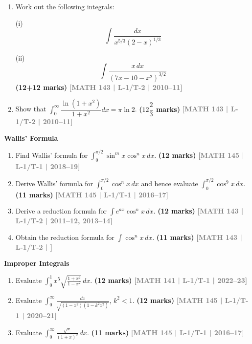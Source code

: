 \documentclass[12pt,a4paper]{article}
\newcommand{\yr}[1]{\hfill\textcolor{gray}{\small\textbf{[#1]}}}
\newcommand{\mk}[1]{\textcolor{orange!70!black}{\small\textbf{(#1 marks)}}}
\newcommand{\subtopic}[2]{%
  \vspace{10pt}
  \noindent\begin{tcolorbox}[colback=#1!8,colframe=#1,boxrule=0.6pt,arc=4pt,
    left=6pt,right=6pt,top=4pt,bottom=4pt]
    \small\bfseries\textcolor{#1}{#2}
  \end{tcolorbox}
  \vspace{2pt}
}
\begin{document}
\begin{enumerate}
\item  Work out the following integrals:

(i) $$\int \frac{dx}{x^{5/3}(2-x)^{1/3}}$$

(ii) $$\int \frac{x \, dx}{(7x - 10 - x^2)^{3/2}}$$
\mk{12+12} \yr{MATH 143 | L-1/T-2 | 2010--11}

\item Show that $\displaystyle\int_{0}^{\infty}\dfrac{\ln(1+x^2)}{1+x^2}dx=\pi\ln{2}$.
\mk{$12\dfrac{2}{3}$} \yr{MATH 143 | L-1/T-2 | 2010--11}

\end{enumerate}

\subtopic{cB}{Wallis' Formula}
\label{sub:s2-wallis}

\begin{enumerate}\item Find Wallis' formula for $\displaystyle\int_{0}^{\pi/2}\sin^{m}x\cos^{n}x\,dx$.
\mk{12} \yr{MATH 145 | L-1/T-1 | 2018--19}

\item Derive Wallis' formula for $\displaystyle\int_{0}^{\pi/2}\cos^{n}x\,dx$ and hence evaluate $\displaystyle\int_{0}^{\pi/2}\cos^{9}x\,dx$.
\mk{11} \yr{MATH 145 | L-1/T-1 | 2016--17}

\item Derive a reduction formula for $\displaystyle\int e^{ax}\cos^{n}x\,dx$.
\mk{12} \yr{MATH 143 | L-1/T-2 | 2011--12, 2013--14}

\item Obtain the reduction formula for $\displaystyle\int \cos^{n}x\,dx$.
\mk{11} \yr{MATH 143 | L-1/T-2 | }

\end{enumerate}

\subtopic{cB}{Improper Integrals}
\label{sub:s2-improper}

\begin{enumerate}\item Evaluate $\displaystyle\int_{0}^{1}x^{5}\sqrt{\frac{1+x^{2}}{1-x^{2}}}\,dx$.
\mk{12} \yr{MATH 141 | L-1/T-1 | 2022--23}

\item Evaluate $\displaystyle\int_{0}^{\infty}\frac{dx}{\sqrt{(1-x^{2})(1-k^{2}x^{2})}}$, $k^{2}<1$.
\mk{12} \yr{MATH 145 | L-1/T-1 | 2020--21}

\item Evaluate $\displaystyle\int_{0}^{\infty}\frac{\sqrt{x}}{(1+x)^{2}}\,dx$.
\mk{11} \yr{MATH 145 | L-1/T-1 | 2016--17}

\end{enumerate}
\end{document}

